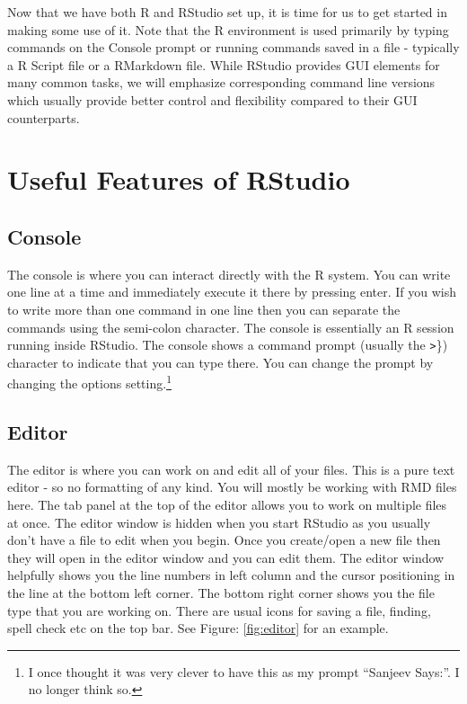 \documentclass[]{krantz}
\theoremstyle{definition}
\theoremstyle{definition}
\theoremstyle{definition}
\theoremstyle{remark}
\begin{document}
Now that we have both R and RStudio set up, it is time for us to get
started in making some use of it. Note that the R environment is used
primarily by typing commands on the Console prompt or running commands
saved in a file - typically a R Script file or a RMarkdown file. While
RStudio provides GUI elements for many common tasks, we will emphasize
corresponding command line versions which usually provide better control
and flexibility compared to their GUI counterparts.

\section{Useful Features of RStudio}\label{useful-features-of-rstudio}

\subsection{Console}\label{console}

The console is where you can interact directly with the R system. You
can write one line at a time and immediately execute it there by
pressing enter. If you wish to write more than one command in one line
then you can separate the commands using the semi-colon character. The
console is essentially an R session running inside RStudio. The console
shows a command prompt (usually the \texttt{\textgreater{}}\}) character
to indicate that you can type there. You can change the prompt by
changing the options setting.\footnote{I once thought it was very clever
  to have this as my prompt ``Sanjeev Says:''. I no longer think so.}

\subsection{Editor}\label{editor}

The editor is where you can work on and edit all of your files. This is
a pure text editor - so no formatting of any kind. You will mostly be
working with RMD files here. The tab panel at the top of the editor
allows you to work on multiple files at once. The editor window is
hidden when you start RStudio as you usually don't have a file to edit
when you begin. Once you create/open a new file then they will open in
the editor window and you can edit them. The editor window helpfully
shows you the line numbers in left column and the cursor positioning in
the line at the bottom left corner. The bottom right corner shows you
the file type that you are working on. There are usual icons for saving
a file, finding, spell check etc on the top bar. See Figure:
\ref{fig:editor} for an example.
\end{document}
